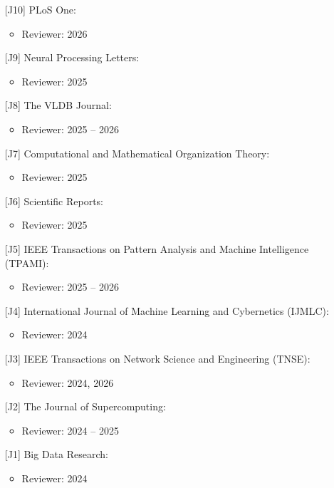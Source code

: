 \documentclass{resume}
\begin{document}
\begin{itemize}[parsep=0.5ex]
\begin{itemize}
\end{itemize}
\item [{[J10]}] PLoS One:
\begin{itemize}
    \item Reviewer: 2026
\end{itemize}
\item [{[J9]}] Neural Processing Letters:
\begin{itemize}
    \item Reviewer: 2025
\end{itemize}
\item [{[J8]}] The VLDB Journal:
\begin{itemize}
    \item Reviewer: 2025 -- 2026
\end{itemize}
\item [{[J7]}] Computational and Mathematical Organization Theory:
\begin{itemize}
    \item Reviewer: 2025
\end{itemize}
\item [{[J6]}] Scientific Reports:
\begin{itemize}
    \item Reviewer: 2025
\end{itemize}
\item [{[J5]}] IEEE Transactions on Pattern Analysis and Machine Intelligence (TPAMI):
\begin{itemize}
    \item Reviewer: 2025 -- 2026
\end{itemize}
\item [{[J4]}] International Journal of Machine Learning and Cybernetics (IJMLC):   
\begin{itemize}
    \item Reviewer: 2024
\end{itemize}
\item [{[J3]}] IEEE Transactions on Network Science and Engineering (TNSE):
\begin{itemize}
    \item Reviewer: 2024, 2026
\end{itemize}
 \item [{[J2]}] The Journal of Supercomputing:
 \begin{itemize}
    \item Reviewer: 2024 -- 2025
\end{itemize}
 \item [{[J1]}] Big Data Research:
 \begin{itemize}
    \item Reviewer: 2024
\end{itemize}
 \end{itemize}
\end{document}
